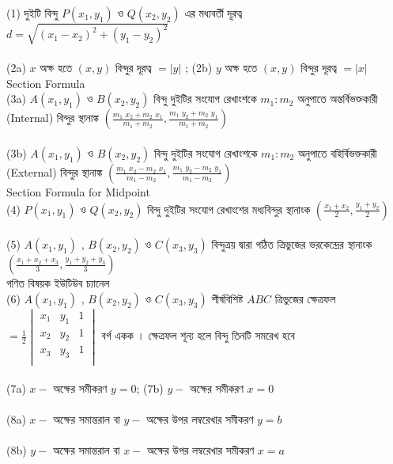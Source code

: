 \documentclass{article}
\begin{document}
 
	\Large  
	(1) দুইটি বিন্দু $P(x_1,y_1)$ ও $Q(x_2,y_2)$ এর মধ্যবর্তী দূরত্ব  $d=\sqrt{(x_1-x_2)^2+(y_1-y_2)^2}$\\
	\\
(2a)	$x$ অক্ষ হতে   $(x,y)$ বিন্দুর দূরত্ব $=|y|$ ; \quad (2b) $y$ অক্ষ হতে   $(x,y)$ বিন্দুর দূরত্ব $=|x|$ \\   
		Section Formula\\
	(3a)	$A(x_1,y_1)$ ও $B(x_2,y_2)$ বিন্দু দুইটির সংযোগ রেখাংশকে  $m_1: m_2$ অনুপাতে অন্তর্বিভক্তকারী (Internal) বিন্দুর স্থানাঙ্ক  $\left(\frac{m_1\,\,x_2+m_2\,\,x_1}{m_1+m_2},\frac{m_1\,\,y_2+m_2\,\,y_1}{m_1+m_2}\right)$\\
		\\
		(3b)	$A(x_1,y_1)$ ও $B(x_2,y_2)$ বিন্দু দুইটির সংযোগ রেখাংশকে  $m_1: m_2$ অনুপাতে বহির্বিভক্তকারী (External) বিন্দুর স্থানাঙ্ক  $\left(\frac{m_1\,\,x_2-m_2\,\,x_1}{m_1-m_2},\frac{m_1\,\,y_2-m_2\,\,y_1}{m_1-m_2}\right)$\\
			Section Formula for Midpoint\\ 
		(4)	$P(x_1,y_1)$ ও $Q(x_2,y_2)$ বিন্দু দুইটির সংযোগ রেখাংশের মধ্যবিন্দুর স্থানাংক $\left(\frac{x_1+x_2}{2},\frac{y_1+y_2}{2}\right)$\\
		\\
			(5)	$A(x_1,y_1)$ ,	$B(x_2,y_2)$ ও	$C(x_3,y_3)$ বিন্দুত্রয় দ্বারা গঠিত ত্রিভুজের ভরকেন্দ্রের স্থানাংক  $\left(\frac{x_1+x_2+x_3}{3},\frac{y_1+y_2+y_3}{3}\right)$\\
				গণিত বিষয়ক ইউটিউব চ্যানেল \\
		(6)	$A(x_1,y_1)$ ,	$B(x_2,y_2)$ ও	$C(x_3,y_3)$ শীর্ষবিশিষ্ট $ABC$ ত্রিভুজের ক্ষেত্রফল $=\frac{1}{2}\begin{vmatrix} 
			x_1 & y_1 & 1\\
			x_2 & y_2 & 1\\
			x_3 & y_3 & 1\\
			\end{vmatrix}$ বর্গ একক । ক্ষেত্রফল শূন্য হলে বিন্দু তিনটি সমরেখ হবে \\
		\\
		(7a)	$x-$ অক্ষের সমীকরণ $y=0$; \quad (7b) $y-$ অক্ষের সমীকরণ $x=0$ \\
		\\
		(8a)	$x-$ অক্ষের সমান্তরাল বা 	$y-$ অক্ষের উপর লম্বরেখার সমীকরণ $y=b$\\
		\\
	(8b) $y-$ অক্ষের সমান্তরাল বা 	$x-$ অক্ষের উপর লম্বরেখার সমীকরণ $x=a$\\
		\\
\end{document}
